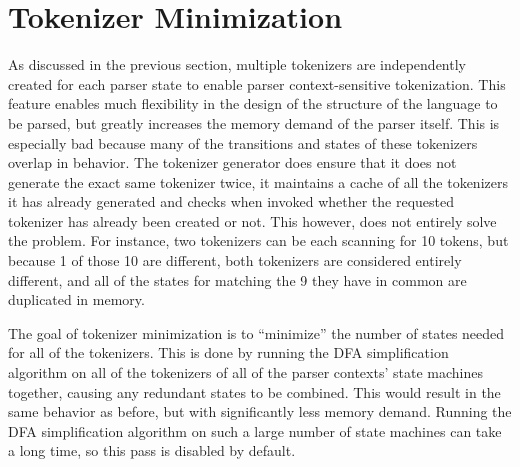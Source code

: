 
\section{Tokenizer Minimization}
{
	As discussed in the previous section,
	multiple tokenizers are independently created for
	each parser state to enable parser context-sensitive tokenization.
	This feature enables much flexibility in the design of the structure
	of the language to be parsed, but greatly increases the memory demand
	of the parser itself. This is especially bad because many
	of the transitions
	and states of these tokenizers overlap in behavior.
	The tokenizer generator does ensure that it does not generate the
	exact same tokenizer twice, it maintains a cache of all the tokenizers
	it has already generated and checks when invoked whether the requested
	tokenizer has already been created or not.
	This however, does not entirely solve the problem.
	For instance, two tokenizers can be each scanning for 10 tokens, but
	because 1 of those 10 are different, both tokenizers are considered
	entirely different, and all of the states for matching the 9 they have
	in common are duplicated in memory.
	
	The goal of tokenizer minimization is to ``minimize'' the number of
	states needed for all of the tokenizers. This is done by running
	the DFA simplification algorithm on all of the tokenizers of all of the
	parser contexts' state machines together,
	causing any redundant states to be combined. This would result
	in the same behavior as before, but with significantly less memory demand.
	Running the DFA simplification algorithm on such a large number
	of state machines can take a long time, so this pass is disabled by
	default.
}







